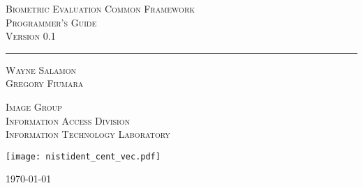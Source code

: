 \begin{titlepage}
\begin{center}

\textsc{\LARGE Biometric Evaluation Common Framework}\\[0.5cm]
\textsc{\Large Programmer's Guide}\\[0.2cm]
\textsc{\Large Version 0.1}
\rule{\linewidth}{0.5mm}

\vfill

\textsc {\Large Wayne Salamon}\\[0.2cm]
\textsc {\Large Gregory Fiumara}

\vfill

\textsc{\Large Image Group}\\[0.2cm]
\textsc{\Large Information Access Division}\\[0.2cm]
\textsc{\Large Information Technology Laboratory}\\[0.4cm]

\graphicspath{{../../doccommon/assets}{../../../../doccommon/assets}}
\texttt{[image: nistident\_cent\_vec.pdf]}

\vfill

\textsc{\large \today}
\vfill
\end{center}
\end{titlepage}
